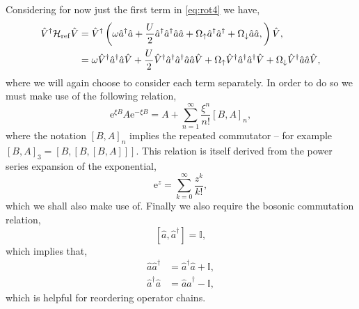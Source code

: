 Considering for now just the first term in \cref{eq:rot4} we have,
\begin{align}
	  \hat{V}^{\dagger}\mathcal{H}_{\mathrm{ref}}\hat{V} &= \hat{V}^{\dagger}\left(  \omega\hat{a}^{\dagger}\hat{a} + \frac{U}{2}\hat{a}^{\dagger}\hat{a}^{\dagger}\hat{a}\hat{a} + \Omega_{\uparrow}\hat{a}^{\dagger}\hat{a}^{\dagger} + \Omega_{\downarrow}\hat{a}\hat{a}, \right)\hat{V}, \notag \\
	  &= \omega\hat{V}^{\dagger}\hat{a}^{\dagger}\hat{a}\hat{V} + \frac{U}{2}\hat{V}^{\dagger}\hat{a}^{\dagger}\hat{a}^{\dagger}\hat{a}\hat{a}\hat{V} + \Omega_{\uparrow}\hat{V}^{\dagger}\hat{a}^{\dagger}\hat{a}^{\dagger}\hat{V} + \Omega_{\downarrow}\hat{V}^{\dagger}\hat{a}\hat{a}\hat{V},
	  \label{eq:rot7}
\end{align}	
where we will again choose to consider each term separately. In order to do so we must make use of the following relation,
\begin{equation}
	\mathrm{e}^{\xi B}A\mathrm{e}^{-\xi B} = A + \sum_{n=1}^{\infty} \frac{\xi^{n}}{n!}\left[B,A\right]_{n},
	\label{eq:rot8}
\end{equation}
where the notation \([B,A]_{n}\) implies the repeated commutator -- for example \([B,A]_{3} = [B, [B, [B,A]]]\). This relation is itself derived from the power series expansion of the exponential,
\begin{equation}
	\mathrm{e}^{z} = \sum_{k=0}^{\infty} \frac{z^{k}}{k!},
	\label{eq:rot9}
\end{equation}
which we shall also make use of. Finally we also require the bosonic commutation relation,
\begin{equation}
	\left[ \hat{a}, \hat{a}^{\dagger} \right] = \mathbb{I},
	\label{eq:rot10}
\end{equation}
which implies that,
\begin{align}
	\hat{a}\hat{a}^{\dagger} &= \hat{a}^{\dagger}\hat{a} + \mathbb{I}, \label{eq:rot11} \\
	\hat{a}^{\dagger}\hat{a} &= \hat{a}\hat{a}^{\dagger} - \mathbb{I}, \label{eq:rot12}
\end{align}
which is helpful for reordering operator chains. 

